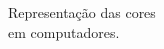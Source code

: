 \documentclass[preview]{standalone}
\begin{document}
Representação das cores \\ em computadores.\\
\end{document}
